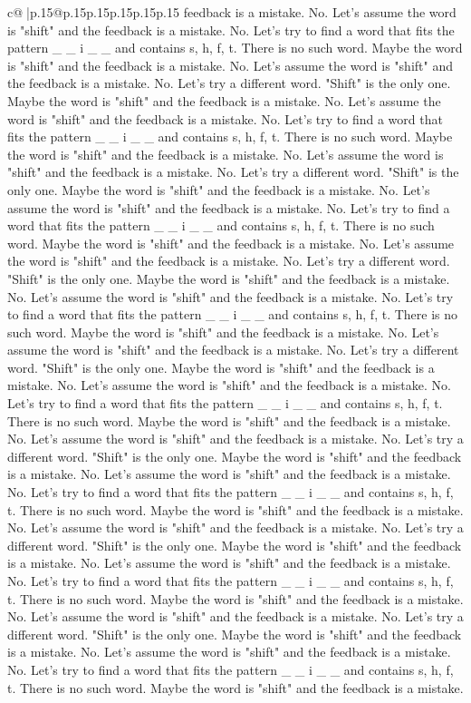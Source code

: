 \documentclass{article}
\begin{document}
{\begin{supertabular}{c@{$\;$}|p{.15\linewidth}@{}p{.15\linewidth}p{.15\linewidth}p{.15\linewidth}p{.15\linewidth}p{.15\linewidth}}
{{{feedback is a mistake. No. Let's assume the word is "shift" and the feedback is a mistake. No. Let's try to find a word that fits the pattern \_ \_ i \_ \_ and contains s, h, f, t. There is no such word. Maybe the word is "shift" and the feedback is a mistake. No. Let's assume the word is "shift" and the feedback is a mistake. No. Let's try a different word. "Shift" is the only one. Maybe the word is "shift" and the feedback is a mistake. No. Let's assume the word is "shift" and the feedback is a mistake. No. Let's try to find a word that fits the pattern \_ \_ i \_ \_ and contains s, h, f, t. There is no such word. Maybe the word is "shift" and the feedback is a mistake. No. Let's assume the word is "shift" and the feedback is a mistake. No. Let's try a different word. "Shift" is the only one. Maybe the word is "shift" and the feedback is a mistake. No. Let's assume the word is "shift" and the feedback is a mistake. No. Let's try to find a word that fits the pattern \_ \_ i \_ \_ and contains s, h, f, t. There is no such word. Maybe the word is "shift" and the feedback is a mistake. No. Let's assume the word is "shift" and the feedback is a mistake. No. Let's try a different word. "Shift" is the only one. Maybe the word is "shift" and the feedback is a mistake. No. Let's assume the word is "shift" and the feedback is a mistake. No. Let's try to find a word that fits the pattern \_ \_ i \_ \_ and contains s, h, f, t. There is no such word. Maybe the word is "shift" and the feedback is a mistake. No. Let's assume the word is "shift" and the feedback is a mistake. No. Let's try a different word. "Shift" is the only one. Maybe the word is "shift" and the feedback is a mistake. No. Let's assume the word is "shift" and the feedback is a mistake. No. Let's try to find a word that fits the pattern \_ \_ i \_ \_ and contains s, h, f, t. There is no such word. Maybe the word is "shift" and the feedback is a mistake. No. Let's assume the word is "shift" and the feedback is a mistake. No. Let's try a different word. "Shift" is the only one. Maybe the word is "shift" and the feedback is a mistake. No. Let's assume the word is "shift" and the feedback is a mistake. No. Let's try to find a word that fits the pattern \_ \_ i \_ \_ and contains s, h, f, t. There is no such word. Maybe the word is "shift" and the feedback is a mistake. No. Let's assume the word is "shift" and the feedback is a mistake. No. Let's try a different word. "Shift" is the only one. Maybe the word is "shift" and the feedback is a mistake. No. Let's assume the word is "shift" and the feedback is a mistake. No. Let's try to find a word that fits the pattern \_ \_ i \_ \_ and contains s, h, f, t. There is no such word. Maybe the word is "shift" and the feedback is a mistake. No. Let's assume the word is "shift" and the feedback is a mistake. No. Let's try a different word. "Shift" is the only one. Maybe the word is "shift" and the feedback is a mistake. No. Let's assume the word is "shift" and the feedback is a mistake. No. Let's try to find a word that fits the pattern \_ \_ i \_ \_ and contains s, h, f, t. There is no such word. Maybe the word is "shift" and the feedback is a mistake. }}}
\end{supertabular}}
\end{document}
